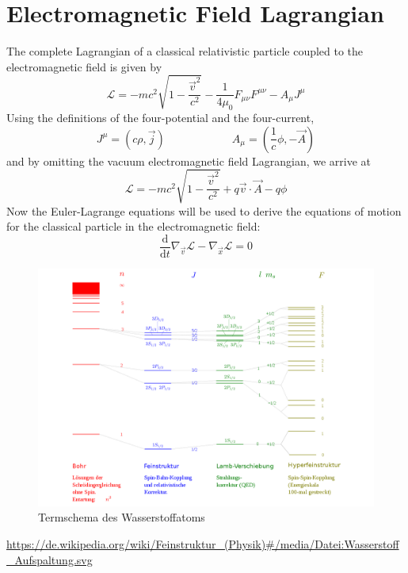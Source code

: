 \documentclass[9pt]{report}
\begin{document}
\section{Electromagnetic Field Lagrangian}

The complete Lagrangian of a classical relativistic particle coupled to the electromagnetic field is given by
\begin{equation}
	\mathcal{L} = -mc^2\sqrt{1-\frac{\vec{v}^2}{c^2}}-\frac{1}{4\mu_0}F_{\mu\nu}F^{\mu\nu}-A_{\mu}J^{\mu}
\end{equation}
Using the definitions of the four-potential and the four-current,
\begin{equation}
	J^{\mu} = (c\rho, \vec{j})\qquad\qquad\qquad A_{\mu}= (\frac{1}{c}\phi, -\vec{A})
\end{equation}
and by omitting the vacuum electromagnetic field Lagrangian, we arrive at
\begin{equation}
	\mathcal{L} = -mc^2\sqrt{1-\frac{\vec{v}^2}{c^2}}+q\vec{v}\cdot\vec{A}-q\phi
\end{equation}
Now the Euler-Lagrange equations will be used to derive the equations of motion for the classical particle in the electromagnetic field:
\begin{equation}
	\frac{\mathrm{d}}{\mathrm{d}t}\nabla_{\vec{v}}\mathcal{L}-\nabla_{\vec{x}}\mathcal{L}=0
\end{equation}











\begin{figure}[H]
	\centering
	\includegraphics[width=16cm]{Wasserstoff_Aufspaltung.png}
	\caption{Termschema des Wasserstoffatoms}
\end{figure}
\url{https://de.wikipedia.org/wiki/Feinstruktur_(Physik)#/media/Datei:Wasserstoff_Aufspaltung.svg}
\end{document}
